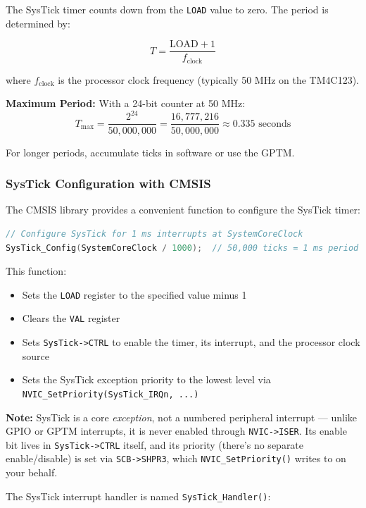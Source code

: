 The SysTick timer counts down from the \texttt{LOAD} value to zero. The period is determined by:

\[
T = \frac{\text{LOAD} + 1}{f_{\text{clock}}}
\]

\noindent
where $f_{\text{clock}}$ is the processor clock frequency (typically 50 MHz on the TM4C123).

\noindent


\noindent
\textbf{Maximum Period:} With a 24-bit counter at 50 MHz:
\[
T_{\text{max}} = \frac{2^{24}}{50{,}000{,}000} = \frac{16{,}777{,}216}{50{,}000{,}000} \approx 0.335 \text{ seconds}
\]

\noindent
For longer periods, accumulate ticks in software or use the GPTM.

\subsubsection{SysTick Configuration with CMSIS}

The CMSIS library provides a convenient function to configure the SysTick timer:

\begin{lstlisting}[caption={SysTick configuration using CMSIS}, language=C]
// Configure SysTick for 1 ms interrupts at SystemCoreClock
SysTick_Config(SystemCoreClock / 1000);  // 50,000 ticks = 1 ms period
\end{lstlisting}

\noindent
This function:
\begin{itemize}[nosep]
  \item Sets the \texttt{LOAD} register to the specified value minus 1
  \item Clears the \texttt{VAL} register
  \item Sets \texttt{SysTick->CTRL} to enable the timer, its interrupt, and the processor clock source
  \item Sets the SysTick exception priority to the lowest level via \texttt{NVIC\_SetPriority(SysTick\_IRQn, ...)}
\end{itemize}

\noindent
\textbf{Note:} SysTick is a core \emph{exception}, not a numbered peripheral interrupt — unlike GPIO or GPTM interrupts, it is never enabled through \texttt{NVIC->ISER}. Its enable bit lives in \texttt{SysTick->CTRL} itself, and its priority (there's no separate enable/disable) is set via \texttt{SCB->SHPR3}, which \texttt{NVIC\_SetPriority()} writes to on your behalf.

\noindent
The SysTick interrupt handler is named \texttt{SysTick\_Handler()}:

